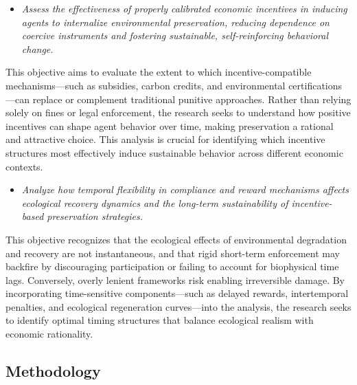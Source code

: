 \begin{itemize}

    \item[\textbf{G4.}]
    
    \textit{Assess the effectiveness of properly calibrated economic incentives in inducing agents to internalize environmental preservation, reducing dependence on coercive instruments and fostering sustainable, self-reinforcing behavioral change.}
    
\end{itemize}

This objective aims to evaluate the extent to which incentive-compatible mechanisms—such as subsidies, carbon credits, and environmental certifications—can replace or complement traditional punitive approaches. Rather than relying solely on fines or legal enforcement, the research seeks to understand how positive incentives can shape agent behavior over time, making preservation a rational and attractive choice. This analysis is crucial for identifying which incentive structures most effectively induce sustainable behavior across different economic contexts.

\begin{itemize}

    \item[\textbf{G5.}]  
    
    \textit{Analyze how temporal flexibility in compliance and reward mechanisms affects ecological recovery dynamics and the long-term sustainability of incentive-based preservation strategies.}
    
\end{itemize}

This objective recognizes that the ecological effects of environmental degradation and recovery are not instantaneous, and that rigid short-term enforcement may backfire by discouraging participation or failing to account for biophysical time lags. Conversely, overly lenient frameworks risk enabling irreversible damage. By incorporating time-sensitive components—such as delayed rewards, intertemporal penalties, and ecological regeneration curves—into the analysis, the research seeks to identify optimal timing structures that balance ecological realism with economic rationality.

\subsection{Methodology}

